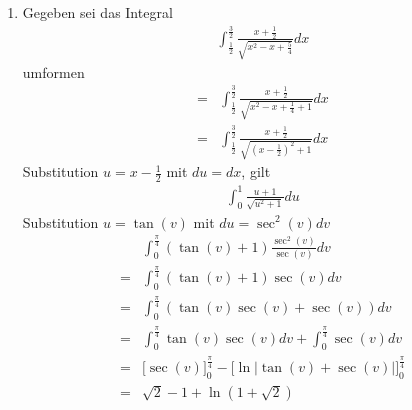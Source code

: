 \begin{enumerate}

\item[]

Gegeben sei das Integral
\begin{align}
\int_{\frac{1}{2}}^{\frac{3}{2}}
\frac{x+\frac{1}{2}}{\sqrt{x^2-x+\frac{5}{4}}}dx
\end{align}
umformen
\begin{align}
=&\int_{\frac{1}{2}}^{\frac{3}{2}}\frac{x+\frac{1}{2}}{\sqrt{x^2-x+\frac{1}{4}+1}}dx \\
=&\int_{\frac{1}{2}}^{\frac{3}{2}}\frac{x+\frac{1}{2}}{\sqrt{(x-\frac{1}{2})^2+1}}dx 
\end{align}
Substitution $u=x-\frac{1}{2}$ mit $du=dx$, gilt
\begin{align}
\int_0^1\frac{u+1}{\sqrt{u^2+1}}du	
\end{align}
Substitution $u=\tan(v)$ mit $du=\sec^2(v)dv$
\begin{align}
&\int_0^{\frac{\pi}{4}}(\tan(v)+1)\frac{\sec^2(v)}{\sec(v)}dv \\
=&\int_0^{\frac{\pi}{4}}(\tan(v)+1)\sec(v)dv \\
=&\int_0^{\frac{\pi}{4}}(\tan(v)\sec(v)+\sec(v))dv \\
=&\int_0^{\frac{\pi}{4}}\tan(v)\sec(v)dv+\int_0^{\frac{\pi}{4}}\sec(v)dv \\
=&
\bigg[
\sec(v)
\bigg]_0^{\frac{\pi}{4}}
-
\bigg[
\ln|\tan(v)+\sec(v)|
\bigg]_0^{\frac{\pi}{4}} \\
=&\sqrt{2}-1+\ln(1+\sqrt{2})
\end{align}

\end{enumerate}
